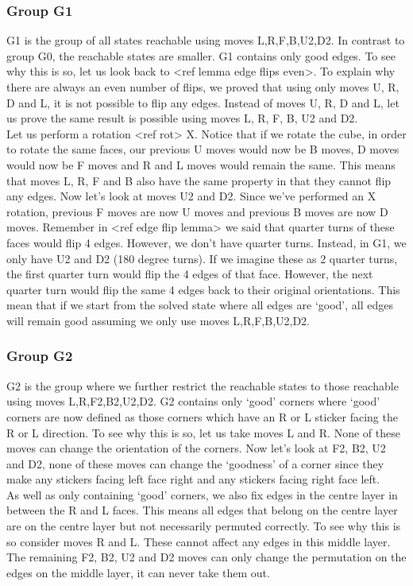 \documentclass[titlepage]{report}[12pt]
\begin{document}
\subsubsection{Group G1} G1 is the group of all states reachable using moves L,R,F,B,U2,D2. In contrast to group G0, the reachable states are smaller. G1 contains only good edges. To see why this is so, let us look back to <ref lemma edge flips even>. To explain why there are always an even number of flips, we proved that using only moves U, R, D and L, it is not possible to flip any edges. Instead of moves U, R, D and L, let us prove the same result is possible using moves L, R, F, B, U2 and D2.
\\
\indent
Let us perform a rotation <ref rot> X. Notice that if we rotate the cube, in order to rotate the same faces, our previous U moves would now be B moves, D moves would now be F moves and R and L moves would remain the same. This means that moves L, R, F and B also have the same property in that they cannot flip any edges. Now let's look at moves U2 and D2. Since we've performed an X rotation, previous F moves are now U moves and previous B moves are now D moves. Remember in <ref edge flip lemma> we said that quarter turns of these faces would flip 4 edges. However, we don't have quarter turns. Instead, in G1, we only have U2 and D2 (180 degree turns). If we imagine these as 2 quarter turns, the first quarter turn would flip the 4 edges of that face. However, the next quarter turn would flip the same 4 edges back to their original orientations. This mean that if we start from the solved state where all edges are `good', all edges will remain good assuming we only use moves L,R,F,B,U2,D2.

\subsubsection{Group G2} 
G2 is the group where we further restrict the reachable states to those reachable using moves L,R,F2,B2,U2,D2. G2 contains only `good' corners where `good' corners are now defined as those corners which have an R or L sticker facing the R or L direction. To see why this is so, let us take moves L and R. None of these moves can change the orientation of the corners. Now let's look at F2, B2, U2 and D2, none of these moves can change the `goodness' of a corner since they make any stickers facing left face right and any stickers facing right face left. 
\\
\indent As well as only containing `good' corners, we also fix edges in the centre layer in between the R and L faces. This means all edges that belong on the centre layer are on the centre layer but not necessarily permuted correctly. To see why this is so consider moves R and L. These cannot affect any edges in this middle layer. The remaining F2, B2, U2 and D2 moves can only change the permutation on the edges on the middle layer, it can never take them out.
\end{document}
